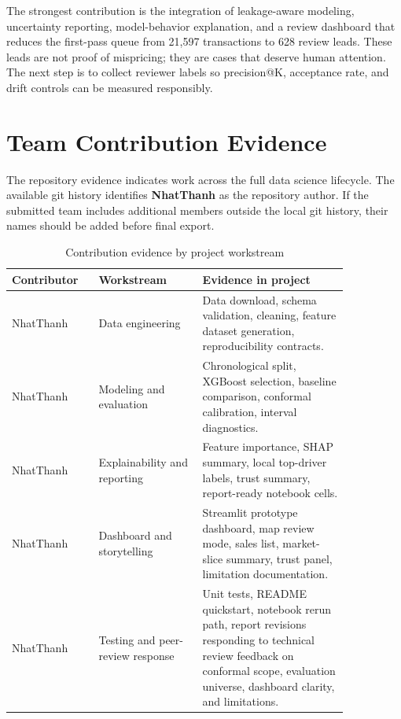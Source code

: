 \documentclass[12pt,a4paper]{article}
\begin{document}
The strongest contribution is the integration of leakage-aware modeling, uncertainty reporting, model-behavior explanation, and a review dashboard that reduces the first-pass queue from 21,597 transactions to 628 review leads. These leads are not proof of mispricing; they are cases that deserve human attention. The next step is to collect reviewer labels so precision@K, acceptance rate, and drift controls can be measured responsibly.

\section{Team Contribution Evidence}
The repository evidence indicates work across the full data science lifecycle. The available git history identifies \textbf{NhatThanh} as the repository author. If the submitted team includes additional members outside the local git history, their names should be added before final export.

\begin{table}[H]
\centering
\caption{Contribution evidence by project workstream}
\label{tab:contribution}
\begin{tabular}{p{0.20\linewidth}p{0.27\linewidth}p{0.38\linewidth}}
\toprule
\textbf{Contributor} & \textbf{Workstream} & \textbf{Evidence in project}\\
\midrule
NhatThanh & Data engineering & Data download, schema validation, cleaning, feature dataset generation, reproducibility contracts.\\
NhatThanh & Modeling and evaluation & Chronological split, XGBoost selection, baseline comparison, conformal calibration, interval diagnostics.\\
NhatThanh & Explainability and reporting & Feature importance, SHAP summary, local top-driver labels, trust summary, report-ready notebook cells.\\
NhatThanh & Dashboard and storytelling & Streamlit prototype dashboard, map review mode, sales list, market-slice summary, trust panel, limitation documentation.\\
NhatThanh & Testing and peer-review response & Unit tests, README quickstart, notebook rerun path, report revisions responding to technical review feedback on conformal scope, evaluation universe, dashboard clarity, and limitations.\\
\bottomrule
\end{tabular}
\end{table}

\newpage
\appendix
\end{document}
